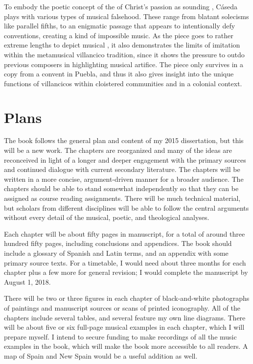 \documentclass{vcbook-proposal}
\begin{document}
To embody the poetic concept of the  of Christ's passion as 
sounding , Cáseda plays with various types of musical falsehood.
These range from blatant solecisms like parallel fifths, to an enigmatic passage
that appears to intentionally defy  conventions, creating a
kind of impossible music.
As the piece goes to rather extreme lengths to depict musical 
, it also demonstrates the limits of imitation within the 
metamusical villancico tradition, since it shows the pressure to outdo previous 
composers in highlighting musical artifice.
The piece only survives in a copy from a convent in Puebla, and thus it also 
gives insight into the unique functions of villancicos within cloistered 
communities and in a colonial context.

\section{Plans}

The book follows the general plan and content of my 2015 dissertation, but this 
will be a new work.%
    \Autocite{Cashner:PhD}
The chapters are reorganized and many of the ideas are reconceived in light of a
longer and deeper engagement with the primary sources and continued dialogue
with current secondary literature.
The chapters will be written in a more concise, argument-driven manner for a
broader audience.
The chapters should be able to stand somewhat independently so that they can be
assigned as course reading assignments.
There will be much technical material, but scholars from different disciplines 
will be able to follow the central arguments without every detail of the 
musical, poetic, and theological analyses.

Each chapter will be about fifty pages in manuscript, for a total of around
three hundred fifty pages, including conclusions and appendices.
The book should include a glossary of Spanish and Latin terms, and an appendix 
with some primary source texts.
For a timetable, I would need about three months for each chapter plus a few 
more for general revision; I would complete the manuscript by August 1, 2018.

There will be two or three figures in each chapter of black-and-white
photographs of paintings and manuscript sources or scans of printed iconography.
All of the chapters include several tables, and several feature my own line
diagrams.
There will be about five or six full-page musical examples in each chapter,
which I will prepare myself.
I intend to secure funding to make recordings of all the music examples in the
book, which will make the book more accessible to all readers.
A map of Spain and New Spain would be a useful addition as well.
\end{document}
